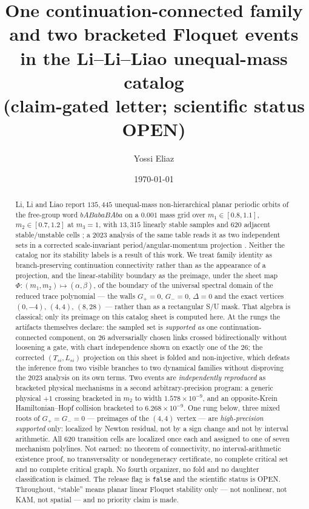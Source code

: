 \documentclass[11pt]{article}
\title{One continuation-connected family and two bracketed Floquet events\\
in the Li--Li--Liao unequal-mass catalog\\
\large (claim-gated letter; scientific status OPEN)}
\author{Yossi Eliaz}
\date{\today}
\begin{document}
\maketitle

\begin{abstract}
Li, Li and Liao report $135{,}445$ unequal-mass non-hierarchical planar periodic orbits of the
free-group word $bABabaBAba$ on a $0.001$ mass grid over $m_1\in[0.8,1.1]$, $m_2\in[0.7,1.2]$ at
$m_3=1$, with $13{,}315$ linearly stable samples and $620$ adjacent stable/unstable cells
\cite{li2021stable}; a 2023 analysis of the same table reads it as two independent sets in a
corrected scale-invariant period/angular-momentum projection \cite{stancevic2023moth}. Neither the
catalog nor its stability labels is a result of this work. We treat family identity as
branch-preserving continuation connectivity rather than as the appearance of a projection, and the
linear-stability boundary as the preimage, under the sheet map $\Phi:(m_1,m_2)\mapsto(\alpha,\beta)$,
of the boundary of the universal spectral domain of the reduced trace polynomial --- the walls
$G_+=0$, $G_-=0$, $\Delta=0$ and the exact vertices $(0,-4)$, $(4,4)$, $(8,28)$ --- rather than as a
rectangular S/U mask. That algebra is classical; only its preimage on this catalog sheet is computed
here. At the rungs the artifacts themselves declare: the sampled set is \emph{supported as} one
continuation-connected component, on $26$ adversarially chosen links crossed bidirectionally without
loosening a gate, with chart independence shown on exactly one of the $26$; the corrected
$(T_{si},L_{si})$ projection on this sheet is folded and non-injective, which defeats the inference
from two visible branches to two dynamical families without disproving the 2023 analysis on its own
terms. Two events are \emph{independently reproduced} as bracketed physical mechanisms in a second
arbitrary-precision program: a generic physical $+1$ crossing bracketed in $m_2$ to width
$1.578\times10^{-9}$, and an opposite-Krein Hamiltonian--Hopf collision bracketed to
$6.268\times10^{-9}$. One rung below, three mixed roots of $G_+=G_-=0$ --- preimages of the $(4,4)$
vertex --- are \emph{high-precision supported} only: localized by Newton residual, not by a sign
change and not by interval arithmetic. All $620$ transition cells are localized once each and
assigned to one of seven mechanism polylines. Not earned: no theorem of connectivity, no
interval-arithmetic existence proof, no transversality or nondegeneracy certificate, no complete
critical set and no complete critical graph. No fourth organizer, no fold and no daughter
classification is claimed. The release flag is \texttt{false} and the scientific status is OPEN.
Throughout, ``stable'' means planar linear Floquet stability only --- not nonlinear, not KAM, not
spatial --- and no priority claim is made.
\end{abstract}
\end{document}
